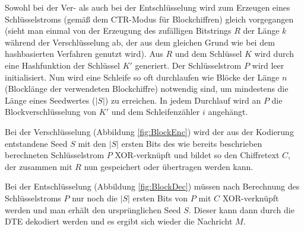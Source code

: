 Sowohl bei der Ver- als auch bei der Entschlüsselung wird zum Erzeugen eines Schlüsselstroms (gemäß dem CTR-Modus für Blockchiffren) gleich vorgegangen (sieht man einmal von der Erzeugung des zufälligen Bitstrings \(R\) der Länge \(k\) während der Verschlüsselung ab, der aus dem gleichen Grund wie bei dem hashbasierten Verfahren genutzt wird). Aus \(R\) und dem Schlüssel \(K\) wird durch eine Hashfunktion der Schlüssel \(K'\) generiert. Der Schlüsselstrom \(P\) wird leer initialisiert. Nun wird eine Schleife so oft durchlaufen wie Blöcke der Länge \(n\) (Blocklänge der verwendeten Blockchiffre) notwendig sind, um mindestens die Länge eines Seedwertes (\(|S|\)) zu erreichen. In jedem Durchlauf wird an \(P\) die Blockverschlüsselung von \(K'\) und dem Schleifenzähler \(i\) angehängt.

Bei der Verschlüsselung (Abbildung \ref{fig:BlockEnc}) wird der aus der Kodierung entstandene Seed \(S\) mit den \(|S|\) ersten Bits des wie bereits beschrieben berechneten Schlüsselstrom \(P\) XOR-verknüpft und bildet so den Chiffretext \(C\), der zusammen mit \(R\) nun gespeichert oder übertragen werden kann.

Bei der Entschlüsselung (Abbildung \ref{fig:BlockDec}) müssen nach Berechnung des Schlüsselstroms \(P\) nur noch die \(|S|\) ersten Bits von \(P\) mit \(C\) XOR-verknüpft werden und man erhält den ursprünglichen Seed \(S\). Dieser kann dann durch die DTE  dekodiert werden und es ergibt sich wieder die Nachricht \(M\).